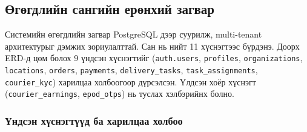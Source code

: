 \subsection{Өгөгдлийн сангийн ерөнхий загвар}
\label{subsec:database_overview}

Системийн өгөгдлийн загвар PostgreSQL дээр суурилж, multi-tenant архитектурыг дэмжих зориулалттай. Сан нь нийт 11 хүснэгтээс бүрдэнэ. Доорх ERD-д цөм болох 9 үндсэн хүснэгтийг (\texttt{auth.users}, \texttt{profiles}, \texttt{organizations}, \texttt{locations}, \texttt{orders}, \texttt{payments}, \texttt{delivery\_tasks}, \texttt{task\_assignments}, \texttt{courier\_kyc}) харилцаа холбоогоор дүрсэлсэн. Үлдсэн хоёр хүснэгт (\texttt{courier\_earnings}, \texttt{epod\_otps}) нь туслах хэлбэрийнх болно.

\subsubsection{Үндсэн хүснэгтүүд ба харилцаа холбоо}

